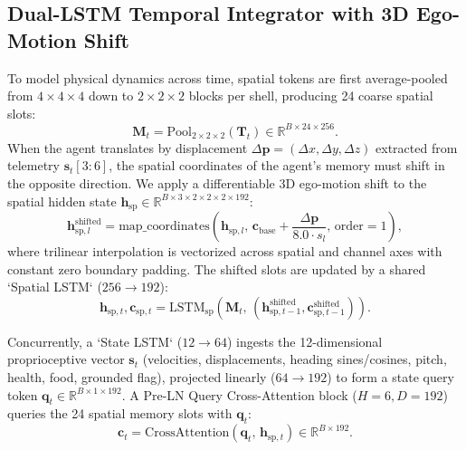 \documentclass{svproc}
\begin{document}
\subsection{Dual-LSTM Temporal Integrator with 3D Ego-Motion Shift}
To model physical dynamics across time, spatial tokens are first average-pooled from $4 \times 4 \times 4$ down to $2 \times 2 \times 2$ blocks per shell, producing 24 coarse spatial slots:
\begin{equation}
\mathbf{M}_t = \mathrm{Pool}_{2\times2\times2}(\mathbf{T}_t) \in \mathbb{R}^{B \times 24 \times 256}.
\end{equation}
When the agent translates by displacement $\Delta \mathbf{p} = (\Delta x, \Delta y, \Delta z)$ extracted from telemetry $\mathbf{s}_t[3:6]$, the spatial coordinates of the agent's memory must shift in the opposite direction. We apply a differentiable 3D ego-motion shift to the spatial hidden state $\mathbf{h}_{\text{sp}} \in \mathbb{R}^{B \times 3 \times 2 \times 2 \times 2 \times 192}$:
\begin{equation}
\mathbf{h}_{\text{sp}, l}^{\text{shifted}} = \mathrm{map\_coordinates}\left(\mathbf{h}_{\text{sp}, l},\, \mathbf{c}_{\text{base}} + \frac{\Delta \mathbf{p}}{8.0 \cdot s_l},\, \text{order}=1\right),
\end{equation}
where trilinear interpolation is vectorized across spatial and channel axes with constant zero boundary padding. The shifted slots are updated by a shared `Spatial LSTM` ($256 \to 192$):
\begin{equation}
\mathbf{h}_{\text{sp}, t}, \mathbf{c}_{\text{sp}, t} = \mathrm{LSTM}_{\text{sp}}\left(\mathbf{M}_t,\, (\mathbf{h}_{\text{sp}, t-1}^{\text{shifted}}, \mathbf{c}_{\text{sp}, t-1}^{\text{shifted}})\right).
\end{equation}

Concurrently, a `State LSTM` ($12 \to 64$) ingests the 12-dimensional proprioceptive vector $\mathbf{s}_t$ (velocities, displacements, heading sines/cosines, pitch, health, food, grounded flag), projected linearly ($64 \to 192$) to form a state query token $\mathbf{q}_t \in \mathbb{R}^{B \times 1 \times 192}$. A Pre-LN Query Cross-Attention block ($H = 6, D = 192$) queries the 24 spatial memory slots with $\mathbf{q}_t$:
\begin{equation}
\mathbf{c}_t = \mathrm{CrossAttention}\left(\mathbf{q}_t,\, \mathbf{h}_{\text{sp}, t}\right) \in \mathbb{R}^{B \times 192}.
\end{equation}
\end{document}
